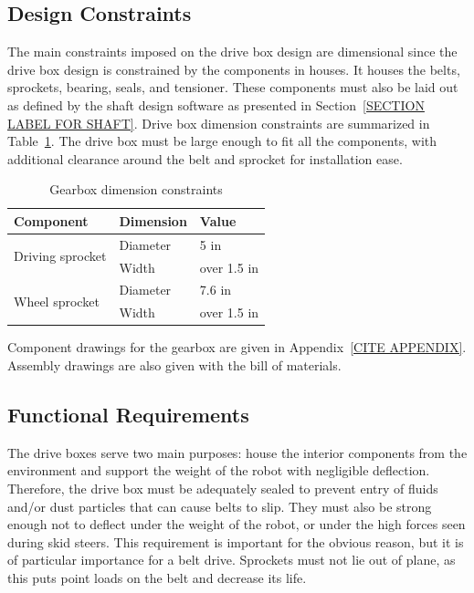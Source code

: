 \subsection{Design Constraints}

The main constraints imposed on the drive box design are dimensional since the drive box design is constrained by the components in houses. It houses the belts, sprockets, bearing, seals, and tensioner. These components must also be laid out as defined by the shaft design software as presented in Section~\ref{SECTION LABEL FOR SHAFT}. %
Drive box dimension constraints are summarized in Table~\ref{tab:box_dim}. The drive box must be large enough to fit all the components, with additional clearance around the belt and sprocket for installation ease.

\begin{table}[htbp]
\centering
\caption{Gearbox dimension constraints}
\begin{tabular}{| lll |}\hline
Component & Dimension & Value \\ \hline
\multirow{2}{*}{Driving sprocket} & Diameter & 5  in \\
& Width & over 1.5 in \\
\multirow{2}{*}{Wheel sprocket} & Diameter & 7.6  in \\
& Width & over 1.5 in \\ \hline
\end{tabular}
\label{tab:box_dim}
\end{table}

Component drawings for the gearbox are given in Appendix~\ref{CITE APPENDIX}. Assembly drawings are also given with the bill of materials.

\subsection{Functional Requirements}

The drive boxes serve two main purposes: house the interior components from the environment and support the weight of the robot with negligible deflection. Therefore, the drive box must be adequately sealed to prevent entry of fluids and/or dust particles that can cause belts to slip. They must also be strong enough not to deflect under the weight of the robot, or under the high forces seen during skid steers. This requirement is important for the obvious reason, but it is of particular importance for a belt drive. Sprockets must not lie out of plane, as this puts point loads on the belt and decrease its life.

